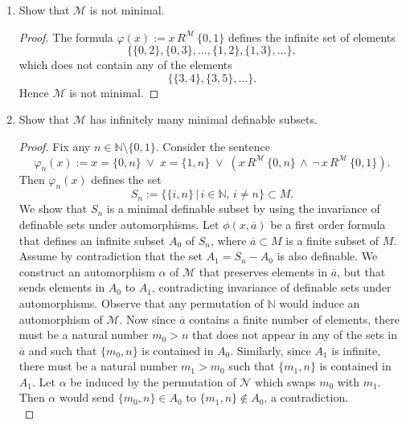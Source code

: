 \documentclass{article}
\begin{document}
\begin{enumerate}
    \begin{enumerate}
      \item Show that $\mathcal{M}$ is not minimal.
        \begin{proof}
          The formula $\varphi(x):=x\,R^{\mathcal{M}}\,\{0,1\}$
          defines the infinite set of elements
          \begin{equation*}
            \{\{0,2\},\{0,3\},\ldots,\{1,2\},\{1,3\},\ldots\},
          \end{equation*}
          which does not contain any of the elements
          \begin{equation*}
            \{\{3,4\},\{3,5\},\ldots\}.
          \end{equation*}
          Hence $\mathcal{M}$ is not minimal.
        \end{proof}

      \item Show that $\mathcal{M}$ has infinitely many minimal
        definable subsets.
        \begin{proof}
          Fix any $n\in\mathbb{N}\setminus\{0,1\}$. Consider the
          sentence
          \begin{equation*}
            \varphi_n(x) := x=\{0,n\}\;\vee\; x=\{1,n\}\;\vee\;
            (x\,R^{\mathcal{M}}\, \{0,n\}\,\wedge\,
            \neg\,x\,R^{\mathcal{M}}\,\{0,1\}).
          \end{equation*}
          Then $\varphi_n(x)$ defines the set
          \begin{equation*}
            S_n := \{\{i,n\}\,|\, i\in\mathbb{N},\,i\neq n\}\subset M.
          \end{equation*}
          We show that $S_n$ is a minimal definable subset by using the
          invariance of definable sets under automorphisms. Let
          $\phi(x,\overline{a})$ be a first order formula that defines
          an infinite subset $A_0$ of $S_n$, where $\overline{a}\subset
          M$ is a finite subset of $M$. Assume by contradiction that
          the set $A_1=S_n-A_0$ is also definable. We construct an
          automorphism $\alpha$ of $\mathcal{M}$ that preserves
          elements in $\overline{a}$, but that sends elements in $A_0$ to
          $A_1$, contradicting invariance of definable sets
          under automorphisms. Observe that any permutation of
          $\mathbb{N}$ would induce an automorphism of $\mathcal{M}$.
          Now since $\overline{a}$ contains a finite number of
          elements, there must be a natural number $m_0>n$ that does
          not appear in any of the sets in $\overline{a}$ and such that
          $\{m_0,n\}$ is contained in $A_0$. Similarly, since $A_1$ is
          infinite, there must be a natural number $m_1>m_0$ such that
          $\{m_1,n\}$ is contained in $A_1$. Let $\alpha$ be induced by
          the permutation of $\mathcal{N}$ which swaps $m_0$ with
          $m_1$. Then $\alpha$ would send $\{m_0,n\}\in A_0$ to
          $\{m_1,n\}\not\in A_0$, a contradiction. \\


\end{proof}
\end{enumerate}
\end{enumerate}
\end{document}
